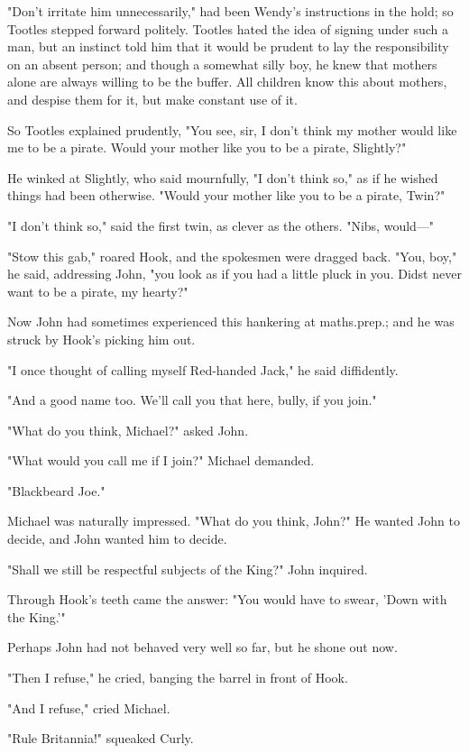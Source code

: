"Don't irritate him unnecessarily," had been Wendy's instructions in the hold;
so Tootles stepped forward politely.
Tootles hated the idea of signing under such a man, but an instinct told him that it would be prudent to lay the responsibility on an absent person;
and though a somewhat silly boy, he knew that mothers alone are always willing to be the buffer.
All children know this about mothers, and despise them for it, but make constant use of it.

So Tootles explained prudently, "You see, sir, I don't think my mother would like me to be a pirate.
Would your mother like you to be a pirate, Slightly?"

He winked at Slightly, who said mournfully, "I don't think so," as if he wished things had been otherwise.
"Would your mother like you to be a pirate, Twin?"

"I don't think so," said the first twin, as clever as the others.
"Nibs, would—"

"Stow this gab," roared Hook, and the spokesmen were dragged back.
"You, boy," he said, addressing John, "you look as if you had a little pluck in you.
Didst never want to be a pirate, my hearty?"

Now John had sometimes experienced this hankering at maths.\@ prep.\@;
and he was struck by Hook's picking him out.

"I once thought of calling myself Red-handed Jack," he said diffidently.

"And a good name too.
We'll call you that here, bully, if you join."

"What do you think, Michael?\@" asked John.

"What would you call me if I join?\@" Michael demanded.

"Blackbeard Joe."

Michael was naturally impressed.
"What do you think, John?"
He wanted John to decide, and John wanted him to decide.

"Shall we still be respectful subjects of the King?\@" John inquired.

Through Hook's teeth came the answer:
"You would have to swear, 'Down with the King.'"

Perhaps John had not behaved very well so far, but he shone out now.

"Then I refuse," he cried, banging the barrel in front of Hook.

"And I refuse," cried Michael.

"Rule Britannia!\@" squeaked Curly.

